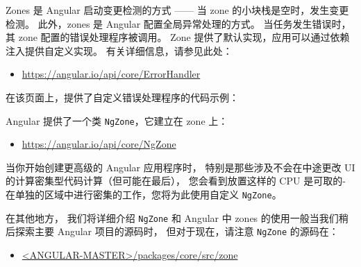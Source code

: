 Zones 是 Angular 启动变更检测的方式 —— 当 zone 的小块栈是空时，发生变更检测。
此外，zones 是 Angular 配置全局异常处理的方式。
当任务发生错误时，其 zone 配置的错误处理程序被调用。
Zone 提供了默认实现，应用可以通过依赖注入提供自定义实现。
有关详细信息，请参见此处：

\begin{itemize}
  \item \url{https://angular.io/api/core/ErrorHandler}
\end{itemize}


在该页面上，提供了自定义错误处理程序的代码示例：




Angular 提供了一个类 \texttt{NgZone}，它建立在 zone 上：

\begin{itemize}
  \item \url{https://angular.io/api/core/NgZone}
\end{itemize}


当你开始创建更高级的 Angular 应用程序时，
特别是那些涉及不会在中途更改 UI 的计算密集型代码计算（但可能在最后），
您会看到放置这样的 CPU 是可取的-
在单独的区域中进行密集的工作，您将为此使用自定义 \texttt{NgZone}。


在其他地方，
我们将详细介绍 \texttt{NgZone} 和 Angular 中 zones 的使用一般当我们稍后探索主要 Angular 项目的源码时，
但对于现在，请注意 \texttt{NgZone} 的源码在：

\begin{itemize}
  \item \href{https://github.com/angular/angular/tree/master/packages/core/src/zone}
        {<ANGULAR-MASTER>/packages/core/src/zone}
\end{itemize}

